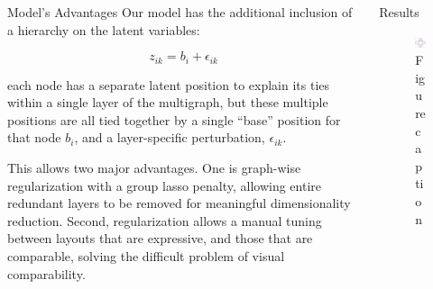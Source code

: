 \documentclass[final]{beamer}
\newlength{\onecolwid}
\newlength{\twocolwid}
\begin{document}
\begin{frame}[t]
\begin{columns}[t]
\begin{column}{\twocolwid}
\begin{columns}[t,totalwidth=\twocolwid]
\begin{column}{\onecolwid}
\begin{block}{Model's Advantages}
Our model has the additional inclusion of a hierarchy on the latent variables:

\[
z_{ik} = b_i + \epsilon_{ik}
\]

each node has a separate latent position to explain its ties within a
single layer of the multigraph, but these multiple positions are all
tied together by a single ``base'' position for that node $b_i$, and a
layer-specific perturbation, $\epsilon_{ik}$.

This allows two major advantages. One is graph-wise regularization
with a group lasso penalty, allowing entire redundant layers to be
removed for meaningful dimensionality reduction. Second,
regularization allows a manual tuning between layouts that are
expressive, and those that are comparable, solving the difficult
problem of visual comparability.

\end{block}


\end{column} %

\begin{column}{\onecolwid} %


\begin{block}{Results}

\begin{figure}
\includegraphics[width=0.8\linewidth]{error_daisy}
\caption{Figure caption}
\end{figure}


\end{block}
\end{column}
\end{columns}
\end{column}
\end{columns}
\end{frame}
\end{document}
